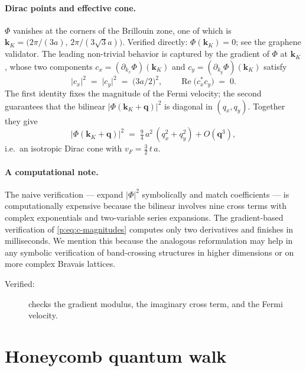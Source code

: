 \documentclass[a4paper,onecolumn,11pt]{quantumarticle}
\def\vk{\ensuremath{\bm{k}}}
\def\vq{\ensuremath{\bm{q}}}
\begin{document}
\paragraph{Dirac points and effective cone.}
$\Phi$ vanishes at the corners of the Brillouin zone, one of which is
$\vk_{K}=\bigl(2\pi/(3a),\,2\pi/(3\sqrt{3}a)\bigr)$. Verified directly:
$\Phi(\vk_{K})=0$; see the graphene validator.
The leading non-trivial behavior is captured by the gradient of $\Phi$ at
$\vk_{K}$, whose two components $c_x = (\partial_{k_x}\Phi)(\vk_{K})$ and
$c_y = (\partial_{k_y}\Phi)(\vk_{K})$ satisfy
\begin{equation}
\lvert c_x\rvert^{2}\;=\;\lvert c_y\rvert^{2}\;=\;\bigl(3a/2\bigr)^{2},
\qquad
\operatorname{Re}\!\bigl(c_x^{*}c_y\bigr)\;=\;0 .
\label{p:eq:c-magnitudes}
\end{equation}
The first identity fixes the magnitude of the Fermi velocity; the second
guarantees that the bilinear $\lvert\Phi(\vk_{K}+\vq)\rvert^{2}$ is
diagonal in $(q_x,q_y)$. Together they give
\begin{equation}
\lvert\Phi(\vk_{K}+\vq)\rvert^{2}\;=\;\tfrac{9}{4}\,a^{2}\,(q_x^{2}+q_y^{2})
+ O(\vq^{3}),
\end{equation}
i.e.\ an isotropic Dirac cone with $v_{F}=\tfrac{3}{2}\,t\,a$.

\paragraph{A computational note.}
The naive verification --- expand $\lvert\Phi\rvert^{2}$ symbolically and
match coefficients --- is computationally expensive because the bilinear
involves nine cross terms with complex exponentials and two-variable
series expansions. The gradient-based verification of
\eqref{p:eq:c-magnitudes} computes only two derivatives and finishes in
milliseconds. We mention this because the analogous reformulation may
help in any symbolic verification of band-crossing structures in higher
dimensions or on more complex Bravais lattices.
\begin{description}
\item[Verified:]
 checks the gradient modulus, the imaginary
cross term, and the Fermi velocity.
\end{description}


\section{Honeycomb quantum walk}
\label{p:qw}
\end{document}
